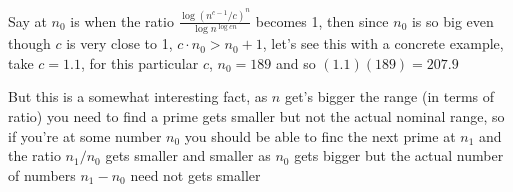 \documentclass[aps,preprint,preprintnumbers,nofootinbib,showpacs,prd]{revtex4-1}
\begin{document}
Say at $n_0$ is when the ratio $\frac{\log (n^{c-1}/c)^n}{ \log n^{\log cn}}$ becomes 1, then since $n_0$ is so big even though $c$ is very close to 1, $c\cdot n_0 > n_0 + 1$, let's see this with a concrete example, take $c = 1.1$, for this particular $c$, $n_0 = 189$ and so $(1.1)(189) = 207.9$

But this is a somewhat interesting fact, as $n$ get's bigger the range (in terms of ratio) you need to find a prime gets smaller but not the actual nominal range, so if you're at some number $n_0$ you should be able to finc the next prime at $n_1$ and the ratio $n_1/n_0$ gets smaller and smaller as $n_0$ gets bigger but the actual number of numbers $n_1 - n_0$ need not gets smaller
\end{document}
